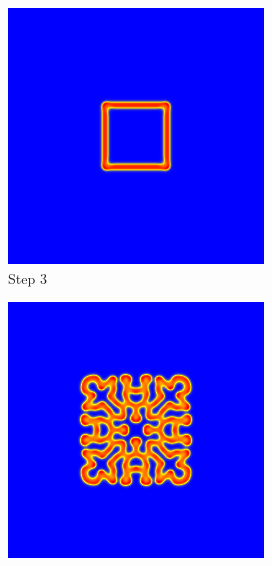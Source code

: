 \documentclass[9pt]{IEEEtran} %
\begin{document}
\begin{figure}[H]
    \centering
    \begin{subfigure}[b]{0.32\columnwidth}
        \includegraphics[width=\textwidth]{frame_00003.png} %
        \caption{Step 3} %
        \label{fig:video_a}
    \end{subfigure}
    \hfill %
    \begin{subfigure}[b]{0.32\columnwidth}
        \includegraphics[width=\textwidth]{frame_00060.png} %

\end{subfigure}
\end{figure}
\end{document}
